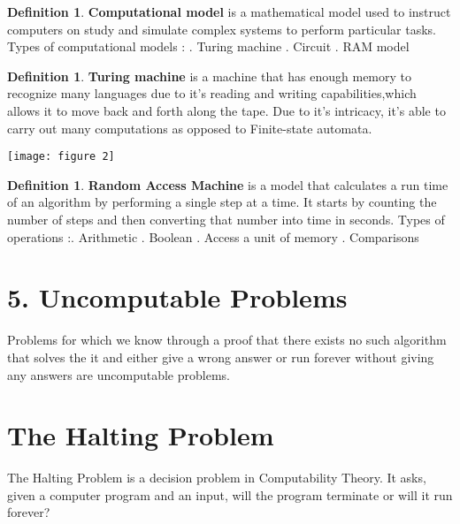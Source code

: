 \documentclass[11pt]{article}
\theoremstyle{plain}
\theoremstyle{definition}
\newtheorem{defn}[thm]{Definition}
\begin{document}
\begin{defn} \textbf{Computational model} is a mathematical model used to instruct computers on study and simulate complex systems to perform 
particular tasks.\cite{nibib:3} \newline
Types of computational models : . Turing machine  . Circuit . RAM model\end{defn}

\begin{defn} \textbf{Turing machine} is  a machine that has enough memory to recognize many languages due to it's reading and writing capabilities,which allows it to move back and forth along the tape. Due to it's intricacy, it's able to carry out many computations as opposed to Finite-state automata.\end{defn}

\texttt{[image: figure 2]}

\begin{defn} \textbf{Random Access Machine} is a model that calculates a run time of an algorithm by performing a single step at a time. It starts by counting the number of steps and then converting that number into time in seconds.  \cite{Skiena:4} \newline
Types of operations :. Arithmetic  . Boolean . Access a unit of memory . Comparisons
\end{defn}



\section*{5. Uncomputable Problems}
Problems for which we know through a proof that there exists no such algorithm that solves the it and either give a wrong answer or run forever without giving any answers are uncomputable problems.
\section*{The Halting Problem}
\par The Halting Problem is a decision problem in Computability Theory. It asks, given a computer program and an input, will the program terminate or will it run forever?
\end{document}
